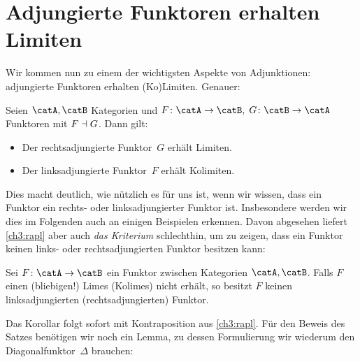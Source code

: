 \chapter{Adjungierte Funktoren erhalten Limiten}
Wir kommen nun zu einem der wichtigsten Aspekte von Adjunktionen: adjungierte
Funktoren erhalten (Ko)Limiten. Genauer:

\begin{thSatz}
    \label{ch3:rapl}
    Seien $\catA,\catB$ Kategorien und $F\colon\catA\to\catB,\;
    G\colon\catB\to\catA$ Funktoren mit $F\dashv G$.
    Dann gilt:
    \begin{itemize}
        \item
            Der rechtsadjungierte Funktor~$G$ erhält Limiten.
        \item
            Der linksadjungierte Funktor~$F$ erhält Kolimiten.
    \end{itemize}
\end{thSatz}

Dies macht deutlich, wie nützlich es für uns ist, wenn wir wissen, dass ein
Funktor ein rechts- oder linksadjungierter Funktor ist. Insbesondere werden wir
dies im Folgenden auch an einigen Beispielen erkennen. Davon abgesehen liefert
\cref{ch3:rapl} aber auch \emph{das Kriterium} schlechthin, um zu zeigen, dass
ein Funktor keinen links- oder rechtsadjungierten Funktor besitzen kann:

\begin{thKorollar}
    \label{ch3:raplkontra}
    Sei $F\colon\catA\to\catB$ ein Funktor zwischen Kategorien $\catA,\catB$.
    Falls $F$ einen (bliebigen!) Limes (Kolimes) nicht erhält, 
    so besitzt $F$ keinen linksadjungierten (rechtsadjungierten) Funktor.
\end{thKorollar}

Das Korollar folgt sofort mit Kontraposition aus \cref{ch3:rapl}. Für den Beweis
des Satzes benötigen wir noch ein Lemma, zu dessen Formulierung wir wiederum den
Diagonalfunktor~$\Delta$ brauchen:

